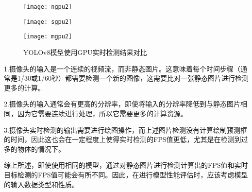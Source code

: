 \documentclass{ctexart}
\numberwithin{equation}{section}%
\numberwithin{figure}{section}%
\numberwithin{table}{section}%
\begin{document}
	\begin{figure}[h]
		\centering
		\begin{minipage}{0.28\linewidth}
			\centering
			\texttt{[image: ngpu2]}
		\end{minipage}
		\begin{minipage}{0.28\linewidth}
			\centering
			\texttt{[image: sgpu2]}
		\end{minipage}
		\begin{minipage}{0.28\linewidth}
			\centering
			\texttt{[image: mgpu2]}
		\end{minipage}
		\caption{YOLOv8模型使用GPU实时检测结果对比}
		\label{t422}%
	\end{figure}

	1.摄像头的输入是一个连续的视频流，而非静态图片。这意味着每个时间步骤（通常是1/30或1/60秒）都需要检测一个新的图像，这需要比对一张静态图片进行检测更多的计算。
	
	2.摄像头的输入通常会有更高的分辨率，即使将输入的分辨率降低到与静态图片相同，因为它需要连续进行处理，所以它需要更多的计算资源。
	
	3.摄像头实时检测的输出需要进行绘图操作，而上述图片检测没有计算绘制预测框的时间，因此这也会在一定程度上使得实时检测的FPS值更低，尤其是在检测到过多的物体的情况下。
	
	综上所述，即使使用相同的模型，通过对静态图片进行检测计算出的FPS值和实时目标检测的FPS值可能会有所不同。因此，在进行模型性能评估时，应该考虑模型的输入数据类型和性质。
	
\end{document}
